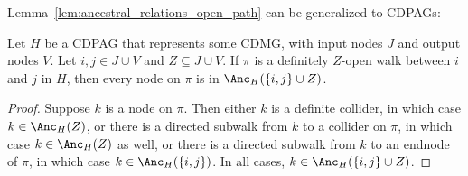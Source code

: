 Lemma~\ref{lem:ancestral_relations_open_path} can be generalized to CDPAGs:
\begin{Lem}\label{lem:dpag_ancestral_relations_definitely_open_path}
  Let $H$ be a CDPAG that represents some CDMG, with input nodes $J$ and output nodes $V$.
  Let $i, j \in J \cup V$ and $Z \subseteq J \cup V$.
  If $\pi$ is a definitely $Z$-open walk between $i$ and $j$ in $H$, then every node on $\pi$ is in $\Anc_H(\{i,j\} \cup Z)$.
\end{Lem}
\begin{proof}
  Suppose $k$ is a node on $\pi$. 
  Then either $k$ is a definite collider, in which case $k \in \Anc_H(Z)$,
  or there is a directed subwalk from $k$ to a collider on $\pi$, in which case $k \in \Anc_H(Z)$ as well,
  or there is a directed subwalk from $k$ to an endnode of $\pi$, in which case $k \in \Anc_H(\{i,j\})$.
  In all cases, $k \in \Anc_H(\{i,j\}\cup Z)$.
\end{proof}

